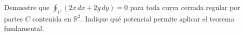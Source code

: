 Demuestre que $\oint_C (2x\,dx+2y\,dy)=0$ para toda curva cerrada regular por partes $C$ contenida en $\mathbb R^2$. Indique qué potencial permite aplicar el teorema fundamental.
